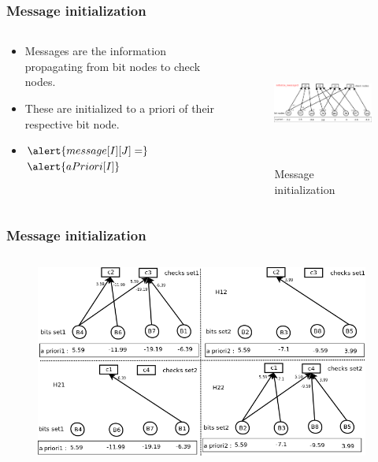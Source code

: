 \documentclass[xcolor=dvipsname]
{beamer}
\begin{document}
\begin{frame}[t]
\frametitle{ Message initialization }  
\begin{columns}[totalwidth=\textwidth]
	\begin{column}{0.4\textwidth}
	\centering
	\begin{itemize}
	\item Messages are the information propagating from bit nodes to check nodes.
	\item These are initialized to a priori of their respective bit node.	
	\item 	$ \alert{message[I][J] =} 
	$
	$
	\alert{aPriori[I]} 
	$ 
	\end{itemize}
 
			
	\end{column}%
	   		
	\begin{column}{0.6\textwidth}
	\centering
	\begin{figure}
	\includegraphics[height=4cm,width=7cm]{minSum3}
	\caption{ Message initialization }
	\end{figure}
	\end{column}%
\end{columns}
\end{frame}


\begin{frame}[t]
\frametitle{ Message initialization }  
\vspace{-5mm}
\begin{figure}
       \includegraphics[height=7cm,width=11cm]{minSumModified2}
       \end{figure}
\end{frame}
\end{document}
